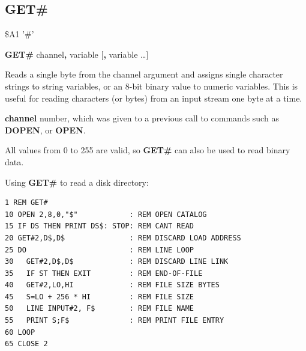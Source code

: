 \subsection{GET\#}
\begin{description}[leftmargin=2cm,style=nextline]
\item [Token:] \$A1 '\#'
\item [Format:] {\bf GET\#} channel{\bf,} variable [{\bf,} variable \dots]
\item [Usage:] Reads a single byte from the channel argument
               and assigns single character strings to
               string variables, or an 8-bit binary value
               to numeric variables.
               This is useful for reading characters (or bytes) from
               an input stream one byte at a time.

               {\bf channel} number, which was given to a previous
               call to commands such as {\bf DOPEN}, or {\bf OPEN}.


\item [Remarks:] All values from 0 to 255 are valid, so {\bf GET\#}
                 can also be used to read binary data.

\item [Example:] Using {\bf GET\#} to read a disk directory:
\begin{tcolorbox}[colback=black,coltext=white]
\verbatimfont{\codefont}
\begin{verbatim}
1 REM GET#
10 OPEN 2,8,0,"$"            : REM OPEN CATALOG
15 IF DS THEN PRINT DS$: STOP: REM CANT READ
20 GET#2,D$,D$               : REM DISCARD LOAD ADDRESS
25 DO                        : REM LINE LOOP
30   GET#2,D$,D$             : REM DISCARD LINE LINK
35   IF ST THEN EXIT         : REM END-OF-FILE
40   GET#2,LO,HI             : REM FILE SIZE BYTES
45   S=LO + 256 * HI         : REM FILE SIZE
50   LINE INPUT#2, F$        : REM FILE NAME
55   PRINT S;F$              : REM PRINT FILE ENTRY
60 LOOP
65 CLOSE 2
\end{verbatim}
\end{tcolorbox}
\end{description}


\newpage
